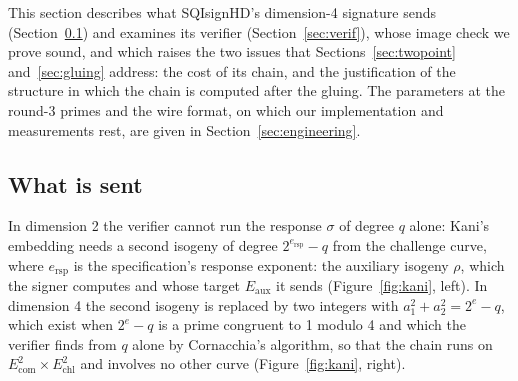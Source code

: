 \documentclass[version=preprint]{iacrcc}
\newcommand{\Ecom}{E_{\mathrm{com}}}
\newcommand{\Echl}{E_{\mathrm{chl}}}
\newcommand{\Eaux}{E_{\mathrm{aux}}}
\begin{document}
    This section describes what SQIsignHD's dimension-4 signature sends
    (Section~\ref{sec:format}) and examines its verifier
    (Section~\ref{sec:verif}), whose image check we prove sound, and which
    raises the two issues that
    Sections~\ref{sec:twopoint} and~\ref{sec:gluing} address: the cost of its
    chain, and the justification of the structure in which the chain is
    computed after the gluing. The parameters at the round-3 primes and the
    wire format, on which our implementation and measurements rest, are given
    in Section~\ref{sec:engineering}.

    \subsection{What is sent}
    \label{sec:format}
    In dimension 2 the verifier cannot run the response $\sigma$ of degree $q$
    alone: Kani's embedding needs a second isogeny of degree
    $2^{e_{\mathrm{rsp}}} - q$ from the challenge curve, where
    $e_{\mathrm{rsp}}$ is the specification's response exponent: the auxiliary
    isogeny $\rho$, which the signer computes
    and whose target $\Eaux$ it sends (Figure~\ref{fig:kani}, left). In
    dimension 4 the second isogeny is replaced by two integers with $a_1^2 +
    a_2^2 = 2^e - q$, which exist when $2^e - q$ is a prime congruent to 1
    modulo 4 and which the verifier finds from $q$ alone by Cornacchia's
    algorithm, so that the chain runs on $\Ecom^2 \times \Echl^2$ and involves
    no other curve (Figure~\ref{fig:kani}, right).
\end{document}
